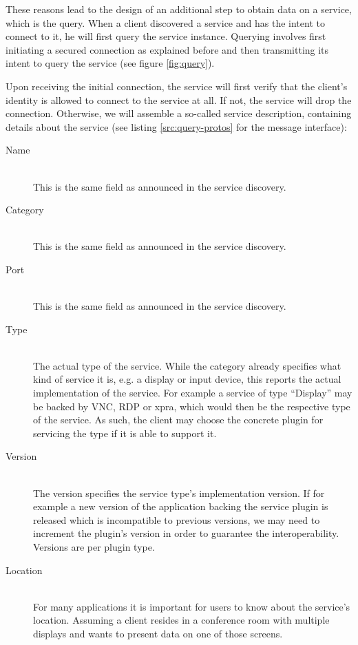 These reasons lead to the design of an additional step to obtain data on a service, which is the query.
When a client discovered a service and has the intent to connect to it, he will first query the service instance.
Querying involves first initiating a secured connection as explained before and then transmitting its intent to query the service (see figure \ref{fig:query}).

Upon receiving the initial connection, the service will first verify that the client's identity is allowed to connect to the service at all.
If not, the service will drop the connection.
Otherwise, we will assemble a so-called service description, containing details about the service (see listing \ref{src:query-protos} for the message interface):
\begin{description}
    \item[Name]\hfill\\
        This is the same field as announced in the service discovery.
    \item[Category]\hfill\\
        This is the same field as announced in the service discovery.
    \item[Port]\hfill\\
        This is the same field as announced in the service discovery.
    \item[Type]\hfill\\
        The actual type of the service.
        While the category already specifies what kind of service it is, e.g. a display or input device, this reports the actual implementation of the service.
        For example a service of type ``Display'' may be backed by VNC, RDP or xpra, which would then be the respective type of the service.
        As such, the client may choose the concrete plugin for servicing the type if it is able to support it.
    \item[Version]\hfill\\
        The version specifies the service type's implementation version.
        If for example a new version of the application backing the service plugin is released which is incompatible to previous versions, we may need to increment the plugin's version in order to guarantee the interoperability.
        Versions are per plugin type.
    \item[Location]\hfill\\
        For many applications it is important for users to know about the service's location.
        Assuming a client resides in a conference room with multiple displays and wants to present data on one of those screens.

\end{description}
